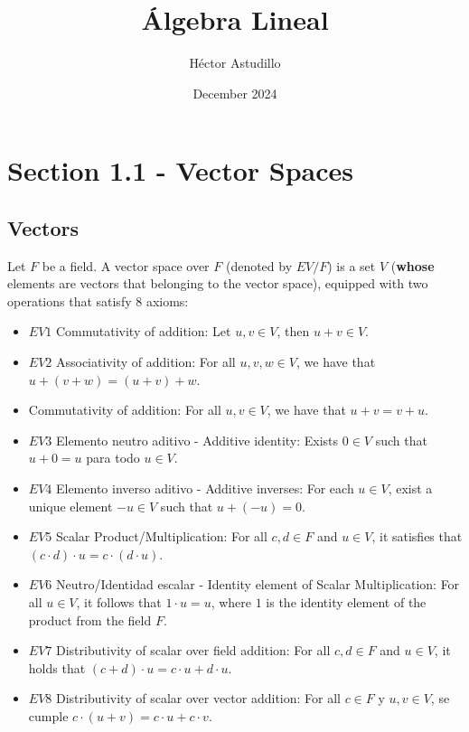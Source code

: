 \documentclass{article}
\title{Álgebra Lineal}
\author{Héctor Astudillo}
\date{December 2024}
\begin{document}
\maketitle

\section{Section 1.1 - Vector Spaces}
\subsection*{Vectors}
Let \( F \) be a field. A vector space over \( F \) (denoted by \( EV/F \)) is a set \( V \) (\textbf{whose} elements are vectors that belonging to the vector space), equipped with two operations that satisfy 8 axioms:

\begin{itemize}
    \item \(EV1\) Commutativity of addition: 
    Let \( u, v \in V \), then \( u + v \in V \).
    \item \(EV2\) Associativity of addition:
    For all \( u, v, w \in V \), we have that \( u + (v + w) = (u + v) + w \).
    \item Commutativity of addition: 
    For all \( u, v \in V \), we have that \( u + v = v + u \).
    \item \(EV3\) Elemento neutro aditivo - Additive identity: 
    Exists \( 0 \in V \) such that \( u + 0 = u \) para todo \( u \in V \).
    \item \(EV4\) Elemento inverso aditivo - Additive inverses:
    For each \( u \in V \), exist a unique element \( -u \in V \) such that \( u + (-u) = 0 \).
    \item \(EV5\) Scalar Product/Multiplication: 
    For all \( c, d \in F \) and \( u \in V \), it satisfies that \( (c \cdot d) \cdot u = c \cdot (d \cdot u) \).
    \item \(EV6\) Neutro/Identidad escalar - Identity element of Scalar Multiplication: 
    For all \( u \in V \), it follows that \( 1 \cdot u = u \), where \( 1 \) is the identity element of the product from the field \( F \).
    \item \(EV7\) Distributivity of scalar over field addition: 
    For all \( c, d \in F \) and \( u \in V \), it holds that \( (c + d) \cdot u = c \cdot u + d \cdot u \).
    \item \(EV8\) Distributivity of scalar over vector addition: 
    For all \( c \in F \) y \( u, v \in V \), se cumple \( c \cdot (u + v) = c \cdot u + c \cdot v \).
\end{itemize}
\end{document}
